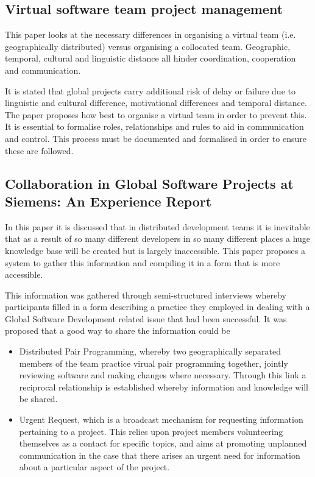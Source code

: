 \documentclass{l4proj}
\begin{document}
\subsection {Virtual software team project management}

This paper looks at the necessary differences in organising a virtual team (i.e. geographically distributed) versus organising a collocated team.  Geographic, temporal, cultural and linguistic distance all hinder coordination, cooperation and communication. 

It is stated that global projects carry additional risk of delay or failure due to linguistic and cultural difference, motivational differences and temporal distance.  The paper proposes how best to organise a virtual team in order to prevent this.  It is essential to formalise roles, relationships and rules to aid in communication and control.  This process must be documented and formalised in order to ensure these are followed. 


\subsection {Collaboration in Global Software Projects at Siemens: An Experience Report}

In this paper it is discussed that in distributed development teams it is inevitable that as a result of so many different developers in so many different places a huge knowledge base will be created but is largely inaccessible.  This paper proposes a system to gather this information and compiling it in a form that is more accessible.

This information was gathered through semi-structured interviews whereby participants filled in a form describing a practice they employed in dealing with a Global Software Development related issue that had been successful.  It was proposed that a good way to share the information could be

\begin{itemize}
\item Distributed Pair Programming, whereby two geographically separated members of the team practice virual pair programming together, jointly reviewing software and making changes where necessary.  Through this link a reciprocal relationship is established whereby information and knowledge will be shared.
\item Urgent Request, which is a broadcast mechanism for requesting information pertaining to a project.  This relies upon project members volunteering themselves as a contact for specific topics, and aims at promoting unplanned communication in the case that there arises an urgent need for information about a particular aspect of the project.
\end{itemize}
\end{document}
